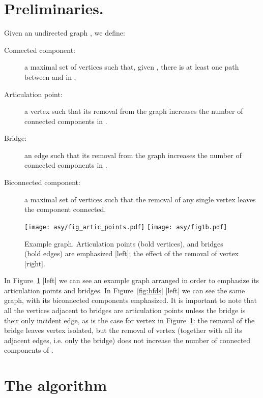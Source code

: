 \documentclass{llncs}
\begin{document}
\section{Preliminaries.}
\label{sec:prelim}
Given an undirected graph , we define:
\begin{description}
	\item[Connected component:] a maximal set of vertices  such that, given , there is at least one path between  and  in . 
	\item[Articulation point:] a vertex  such that its removal from the graph  increases the number of connected components in . 
	\item[Bridge:] an edge  such that its removal from the graph  increases the number of connected components in . 
	\item[Biconnected component:] a maximal set of vertices  such that the removal of any single vertex  leaves the component connected.
\end{description}

\begin{figure}[t!]
	\texttt{[image: asy/fig\_artic\_points.pdf]}\hfill \raisebox{1cm}{} \hfill
	\texttt{[image: asy/fig1b.pdf]}
	\caption{Example graph. Articulation points (bold vertices), and bridges (bold edges) are emphasized [left]; the effect of the removal of vertex  [right].\label{fig:graphccs}}
\end{figure}

In Figure~\ref{fig:graphccs} [left] we can see an example graph arranged in order to emphasize its articulation points and bridges. In Figure~\ref{fig:bfds} [left] we can see the same graph, with its biconnected components emphasized. It is important to note that all the vertices adjacent to bridges are articulation points unless the bridge is their only incident edge, as is the case for vertex  in Figure~\ref{fig:graphccs}: the removal of the bridge leaves vertex  isolated, but the removal of vertex  (together with all its adjacent edges, i.e. only the bridge) does not increase the number of connected components of .



\section{The algorithm}
\label{sec:alg}
\end{document}
